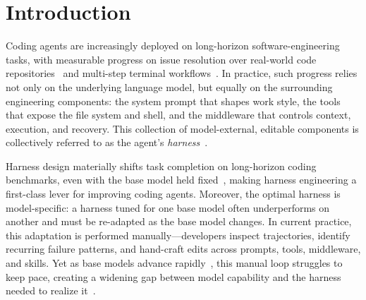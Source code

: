 \section{Introduction}
\label{sec:introduction}


Coding agents are increasingly deployed on long-horizon software-engineering tasks, with measurable progress on issue resolution over real-world code repositories~\citep{jimenezSWEbenchCanLanguage2023,yangSWEbenchMultimodalAI2024,dengSWEBenchProCan2025} and multi-step terminal workflows~\citep{merrillTerminalBenchBenchmarkingAgents2026a}.
In practice, such progress relies not only on the underlying language model, but equally on the surrounding engineering components: the system prompt that shapes work style, the tools that expose the file system and shell, and the middleware that controls context, execution, and recovery.
This collection of model-external, editable components is collectively referred to as the agent's \emph{harness}~\citep{rajasekaranHarnessDesignLongrunning2026,lopopoloHarnessEngineeringLeveraging2026,wangOpenHandsOpenPlatform2025,yangSWEagentAgentComputerInterfaces2024,steinbergerOpenClawPersonalAI2026,HermesAgentAgent}.


Harness design materially shifts task completion on long-horizon coding benchmarks, even with the base model held fixed~\citep{trivedyImprovingDeepAgents2026,wangOpenHandsOpenPlatform2025}, making harness engineering a first-class lever for improving coding agents.
Moreover, the optimal harness is model-specific: a harness tuned for one base model often underperforms on another and must be re-adapted as the base model changes.
In current practice, this adaptation is performed manually—developers inspect trajectories, identify recurring failure patterns, and hand-craft edits across prompts, tools, middleware, and skills.
Yet as base models advance rapidly~\citep{xiaomimimoteamMiMoV25Pro2026,teamQwen36PlusRealWorld2026,yangQwen3TechnicalReport2025a,DeepSeek_V4pdfDeepseekaiDeepSeekV4Pro2026,kimiteamKimiK26Tech2026,teamKimiK25Visual2026}, this manual loop struggles to keep pace, creating a widening gap between model capability and the harness needed to realize it~\citep{steinbergerOpenClawPersonalAI2026}.


